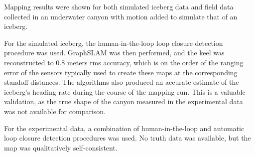 Mapping results were shown for both simulated iceberg data and field data collected in an underwater canyon with motion added to simulate that of an iceberg. 

For the simulated iceberg, the human-in-the-loop loop closure detection procedure was used. GraphSLAM was then performed, and the keel was reconstructed to 0.8 meters rms accuracy, which is on the order of the ranging error of the sensors typically used to create these maps at the corresponding standoff distances. The algorithms also produced an accurate estimate of the iceberg's heading rate during the course of the mapping run. This is a valuable validation, as the true shape of the canyon measured in the experimental data was not available for comparison.

For the experimental data, a combination of human-in-the-loop and automatic loop closure detection procedures was used. No truth data was available, but the map was qualitatively self-consistent. 


